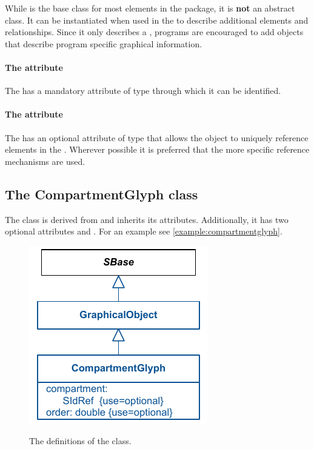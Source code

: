 While \GraphicalObject is the base class for most elements in the \Layout 
package, it is \textbf{not} an abstract class. It can be instantiated when used 
in the  to describe additional 
elements and relationships. Since it only describes a \BoundingBox, programs 
are encouraged to add \Annotation objects that describe program 
specific graphical information. 

\paragraph{The  attribute}
The \GraphicalObject has a mandatory  attribute of type 
 through which it can be identified. 


\paragraph{The  attribute}
The \GraphicalObject has an optional  attribute of type 
 that allows the object to uniquely reference elements 
in the \Model. Wherever possible it is preferred that the more specific 
reference mechanisms are used. 


\subsection{The CompartmentGlyph class }
\label{compartmentglyph-class}
The \CompartmentGlyph class is derived from \GraphicalObject and 
inherits its attributes. Additionally, it has two optional attributes 
 and . For an example see 
\ref{example:compartmentglyph}. 



\begin{figure}[!h]
\includegraphics{uml/layout-compartmentglyph-uml}\\
\label{uml:compartmentglyph}
\caption{The definitions of the \CompartmentGlyph class.}
\end{figure}


